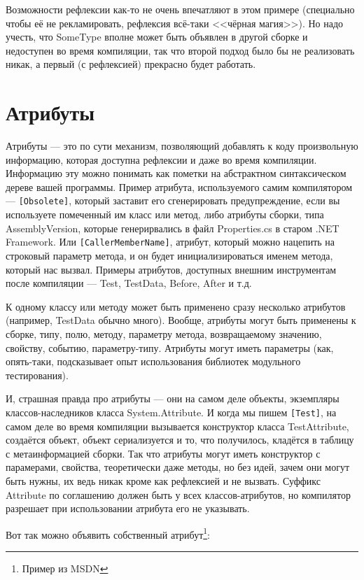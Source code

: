 \documentclass[a5paper]{article}
\begin{document}
Возможности рефлексии как-то не очень впечатляют в этом примере (специально чтобы её не рекламировать, рефлексия всё-таки <<чёрная магия>>). Но надо учесть, что SomeType вполне может быть объявлен в другой сборке и недоступен во время компиляции, так что второй подход было бы не реализовать никак, а первый (с рефлексией) прекрасно будет работать.

\section{Атрибуты}

Атрибуты --- это по сути механизм, позволяющий добавлять к коду произвольную информацию, которая доступна рефлексии и даже во время компиляции. Информацию эту можно понимать как пометки на абстрактном синтаксическом дереве вашей программы. Пример атрибута, используемого самим компилятором --- \texttt{[Obsolete]}, который заставит его сгенерировать предупреждение, если вы используете помеченный им класс или метод, либо атрибуты сборки, типа AssemblyVersion, которые генерирвались в файл Properties.cs в старом .NET Framework. Или \texttt{[CallerMemberName]}, атрибут, который можно нацепить на строковый параметр метода, и он будет инициализироваться именем метода, который нас вызвал. Примеры атрибутов, доступных внешним инструментам после компиляции --- Test, TestData, Before, After и т.д. 

К одному классу или методу может быть применено сразу несколько атрибутов (например, TestData обычно много). Вообще, атрибуты могут быть применены к сборке, типу, полю, методу, параметру метода, возвращаемому значению, свойству, событию, параметру-типу. Атрибуты могут иметь параметры (как, опять-таки, подсказывает опыт использования библиотек модульного тестирования). 

И, страшная правда про атрибуты --- они на самом деле объекты, экземпляры классов-наследников класса System.Attribute. И когда мы пишем \texttt{[Test]}, на самом деле во время компиляции вызывается конструктор класса TestAttribute, создаётся объект, объект сериализуется и то, что получилось, кладётся в таблицу с метаинформацией сборки. Так что атрибуты могут иметь конструктор с парамерами, свойства, теоретически даже методы, но без идей, зачем они могут быть нужны, их ведь никак кроме как рефлексией и не вызвать. Суффикс Attribute по соглашению должен быть у всех классов-атрибутов, но компилятор разрешает при использовании атрибута его не указывать.

Вот так можно объявить собственный атрибут\footnote{Пример из MSDN}:
\end{document}
